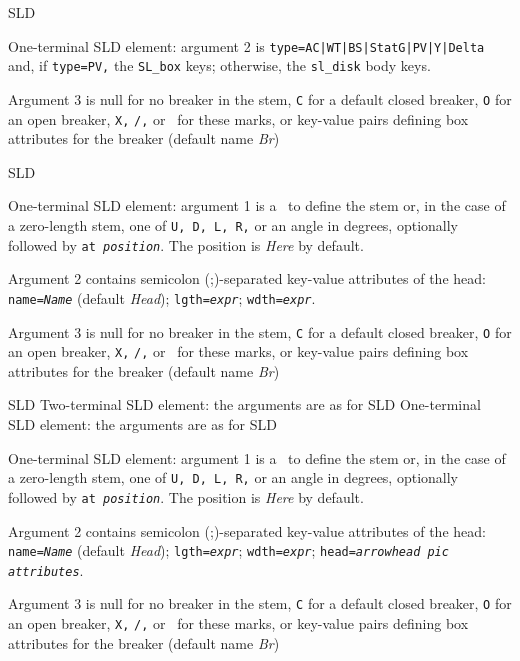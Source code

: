   {SLD}
  {One-terminal SLD element: argument 2 is
   {\tt type=AC|WT|BS|StatG|PV|Y|Delta} and,
   if {\tt type=PV,} the {\tt SL\_box} keys;
   otherwise, the {\tt sl\_disk} body keys.

   Argument 3 is null for no breaker in the stem, {\tt C} for a default
   closed breaker, {\tt O} for an open breaker, {\tt X,} {\tt /,} or \bsl\ for
   these marks, or
   key-value pairs defining box attributes for the breaker
   (default name {\sl Br})
   }
  {SLD}
  {One-terminal SLD element: argument 1 is a \linespec\ to define the stem
   or, in the case of a zero-length stem, one of {\tt U, D, L, R,} or an
   angle in degrees, optionally followed by {\tt at {\sl position}}.
   The position is {\sl Here} by default.

   Argument 2 contains semicolon (;)-separated key-value attributes
   of the head:
   {\tt name={\sl{}Name}} (default {\sl Head});
   {\tt lgth={\sl{}expr}};
   {\tt wdth={\sl{}expr}}.

   Argument 3 is null for no breaker in the stem, {\tt C} for a default
   closed breaker, {\tt O} for an open breaker, {\tt X,} {\tt /,} or \bsl\ for
   these marks, or
   key-value pairs defining box attributes for the breaker
   (default name {\sl Br})
   }
  {SLD}
  {Two-terminal SLD element: the arguments are as for 
   }
  {SLD}
  {One-terminal SLD element: the arguments are as for 
   }
  {SLD}
  {One-terminal SLD element: argument 1 is a \linespec\ to define the stem
   or, in the case of a zero-length stem, one of {\tt U, D, L, R,} or an
   angle in degrees, optionally followed by {\tt at {\sl position}}.
   The position is {\sl Here} by default.

   Argument 2 contains semicolon (;)-separated key-value attributes
   of the head:
   {\tt name={\sl{}Name}} (default {\sl Head});
   {\tt lgth={\sl{}expr}};
   {\tt wdth={\sl{}expr}};
   {\tt head={\sl{}arrowhead pic attributes}}.

   Argument 3 is null for no breaker in the stem, {\tt C} for a default
   closed breaker, {\tt O} for an open breaker, {\tt X,} {\tt /,} or \bsl\ for
   these marks, or
   key-value pairs defining box attributes for the breaker
   (default name {\sl Br})
   }
